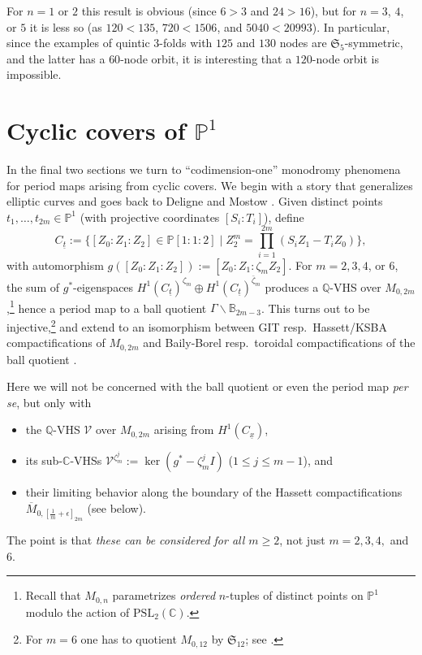 \documentclass[12pt,letterpaper,english]{amsart}
\numberwithin{equation}{section}
\numberwithin{figure}{section}
\theoremstyle{plain}
\theoremstyle{remark}
\theoremstyle{definition}
\theoremstyle{definition}
\theoremstyle{plain}
\theoremstyle{plain}
\theoremstyle{plain}
\theoremstyle{plain}
\theoremstyle{definition}
\def\ut{\underline{t}}
\def\ux{\underline{x}}
\def\QQ{\mathbb{Q}}
\def\CC{\mathbb{C}}
\def\PP{\mathbb{P}}
\def\ut{\underline{t}}
\def\V{\mathcal{V}}
\def\BB{\mathbb{B}}
\theoremstyle{definition}
\begin{document}
For $n=1$ or $2$ this result is obvious (since $6>3$ and $24>16$), but for $n=3$, $4$, or $5$ it is less so (as $120<135$, $720<1506$, and $5040<20993$). In particular, since the examples of quintic 3-folds with $125$ and $130$ nodes are $\mathfrak{S}_5$-symmetric, and the latter has a $60$-node orbit, it is interesting that a $120$-node orbit is impossible.



\section{Cyclic covers of $\PP^1$}\label{S4}

In the final two sections we turn to ``codimension-one'' monodromy phenomena for period maps arising from cyclic covers. We begin with a story that generalizes elliptic curves and goes back to Deligne and Mostow \cite{DM}. Given distinct points $t_1,\ldots,t_{2m}\in \PP^1$ (with projective coordinates $[S_i{:}T_i]$), define 
$$C_{\ut}:=\{[Z_0{:}Z_1{:}Z_2]\in \PP[1{:}1{:}2]\mid Z_2^m=\textstyle\prod_{i=1}^{2m}(S_iZ_1-T_iZ_0)\},$$
with automorphism $g([Z_0{:}Z_1{:}Z_2]):=[Z_0{:}Z_1{:}\zeta_m Z_2]$. For $m=2,3,4$, or $6$, the sum of $g^*$-eigenspaces $H^1(C_{\ut})^{\zeta_m}\oplus H^1(C_{\ut})^{\bar{\zeta}_m}$ produces a $\QQ$-VHS over $M_{0,2m}$,\footnote{Recall that $M_{0,n}$ parametrizes \emph{ordered} $n$-tuples of distinct points on $\PP^1$ modulo the action of $\mathrm{PSL}_2(\CC)$.} hence a period map to a ball quotient $\Gamma\backslash\BB_{2m-3}$. This turns out to be injective,\footnote{For $m=6$ one has to quotient $M_{0,12}$ by $\mathfrak{S}_{12}$; see \cite{GKS}.} and extend to an isomorphism between GIT resp.~Hassett/KSBA compactifications of $M_{0,2m}$ and Baily-Borel resp.~toroidal compactifications of the ball quotient \cite{DM,GKS}.

Here we will not be concerned with the ball quotient or even the period map \emph{per se}, but only with 
\begin{itemize}[leftmargin=0.5cm]
\item the $\QQ$-VHS $\V$ over $M_{0,2m}$ arising from $H^1(C_{\ux})$, 
\item its sub-$\CC$-VHSs $\V^{\zeta_m^j}:=\ker(g^*-\zeta_m^j I)$ ($1\leq j\leq m-1$), and 
\item their limiting behavior along the boundary of the Hassett compactifications $\overline{M}_{0,[\frac{1}{m}+\epsilon]_{2m}}$ (see below). 
\end{itemize}
The point is that \emph{these can be considered for all $m\geq 2$}, not just $m=2,3,4,$ and $6$.
\end{document}
